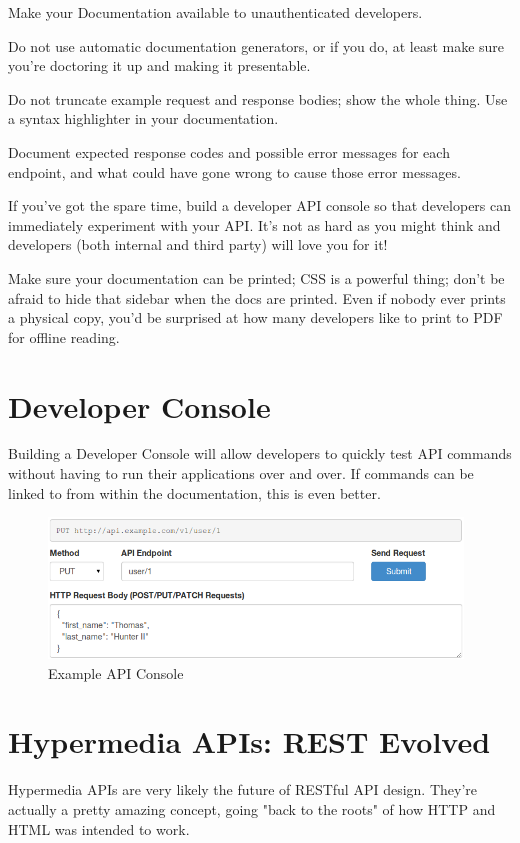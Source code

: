 \documentclass{book}
\begin{document}
Make your Documentation available to unauthenticated developers.

Do not use automatic documentation generators, or if you do, at least make sure you're doctoring it up and making it presentable.

Do not truncate example request and response bodies; show the whole thing. Use a syntax highlighter in your documentation.

Document expected response codes and possible error messages for each endpoint, and what could have gone wrong to cause those error messages.

If you've got the spare time, build a developer API console so that developers can immediately experiment with your API. It's not as hard as you might think and developers (both internal and third party) will love you for it!

Make sure your documentation can be printed; CSS is a powerful thing; don't be afraid to hide that sidebar when the docs are printed. Even if nobody ever prints a physical copy, you'd be surprised at how many developers like to print to PDF for offline reading.


\chapter{Developer Console}

Building a Developer Console will allow developers to quickly test API commands without having to run their applications over and over. If commands can be linked to from within the documentation, this is even better.

\begin{figure}[ht!]
\centering
\includegraphics[width=110mm]{images/api-console.png}
\caption{Example API Console}
\label{overflow}
\end{figure}


\chapter{Hypermedia APIs: REST Evolved}

Hypermedia APIs are very likely the future of RESTful API design. They're actually a pretty amazing concept, going "back to the roots" of how HTTP and HTML was intended to work.
\end{document}
